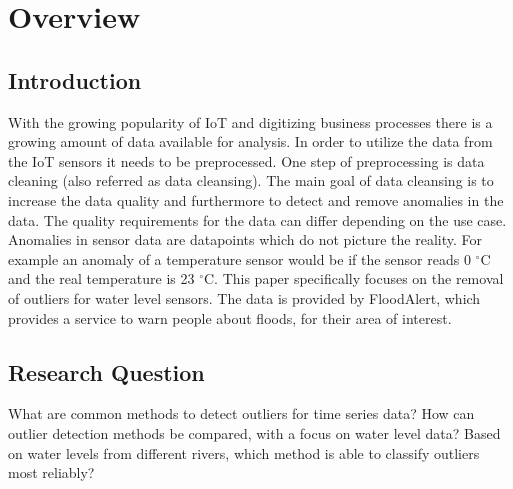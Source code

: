 \chapter{Overview}

\section{Introduction}\label{section:introduction}
With the growing popularity of \ac{IoT} and digitizing business processes there is a growing amount of data available for analysis.
In order to utilize the data from the \ac{IoT} sensors it needs to be preprocessed. One step of preprocessing is data cleaning (also referred as data cleansing).
The main goal of data cleansing is to increase the data quality and furthermore to detect and remove anomalies in the data. The quality requirements for the data can differ depending on the use case. Anomalies in sensor data are datapoints which do not picture the reality. For example an anomaly of a temperature sensor would be if the sensor reads 0 $^{\circ}$C and the real temperature is 23 $^{\circ}$C. This paper specifically focuses on the removal of outliers for water level sensors. The data is provided by FloodAlert\cite{strassmayrFloodAlertWaterLevels}, which provides a service to warn people about floods, for their area of interest.

\section{Research Question}
What are common methods to detect outliers for time series data? \newline
How can outlier detection methods be compared, with a focus on water level data? \newline
Based on water levels from different rivers, which method is able to classify outliers most reliably?


